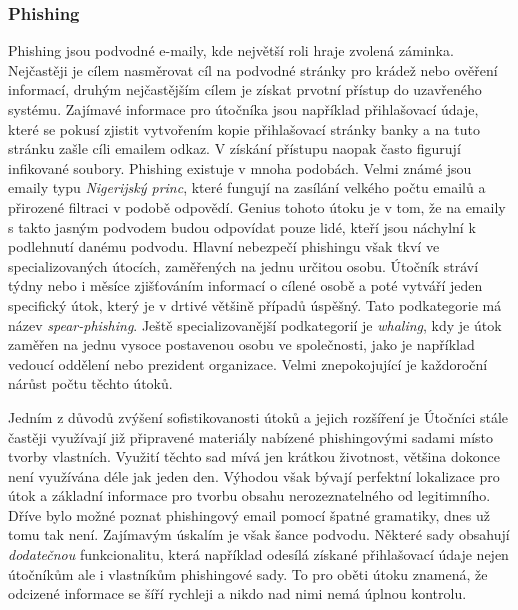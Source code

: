 \subsubsection{Phishing}
Phishing jsou podvodné e-maily, kde největší roli hraje zvolená záminka.
Nejčastěji je cílem nasměrovat cíl na podvodné stránky pro krádež nebo ověření informací, druhým nejčastějším cílem je získat prvotní přístup do uzavřeného systému.
Zajímavé informace pro útočníka jsou například přihlašovací údaje, které se pokusí zjistit vytvořením kopie přihlašovací stránky banky a na tuto stránku zašle cíli emailem odkaz.
V získání přístupu naopak často figurují infikované soubory.
Phishing existuje v mnoha podobách.
Velmi známé jsou emaily typu \textit{Nigerijský princ}, které fungují na zasílání velkého počtu emailů a přirozené filtraci v podobě odpovědí.
Genius tohoto útoku je v tom, že na emaily s takto jasným podvodem budou odpovídat pouze lidé, kteří jsou náchylní k podlehnutí danému podvodu.
Hlavní nebezpečí phishingu však tkví ve specializovaných útocích, zaměřených na jednu určitou osobu.
Útočník stráví týdny nebo i měsíce zjišťováním informací o cílené osobě a poté vytváří jeden specifický útok, který je v drtivé většině případů úspěšný.
Tato podkategorie má název \textit{spear-phishing}.
Ještě specializovanější podkategorií je \textit{whaling}, kdy je útok zaměřen na jednu vysoce postavenou osobu ve společnosti, jako je například vedoucí oddělení nebo prezident organizace.
Velmi znepokojující je každoroční nárůst počtu těchto útoků.\cite{moje_bakalarka}

Jedním z důvodů zvýšení sofistikovanosti útoků a jejich rozšíření je 
Útočníci stále častěji využívají již připravené materiály nabízené phishingovými sadami místo tvorby vlastních.
Využití těchto sad mívá jen krátkou životnost, většina dokonce není využívána déle jak jeden den.
Výhodou však bývají perfektní lokalizace pro útok a základní informace pro tvorbu obsahu nerozeznatelného od legitimního.
Dříve bylo možné poznat phishingový email pomocí špatné gramatiky, dnes už tomu tak není.
Zajímavým úskalím je však šance podvodu.
Některé sady obsahují \textit{dodatečnou} funkcionalitu, která například odesílá získané přihlašovací údaje nejen útočníkům ale i vlastníkům phishingové sady.
To pro oběti útoku znamená, že odcizené informace se šíří rychleji a nikdo nad nimi nemá úplnou kontrolu.\cite{Enisa_thread_landscape}



